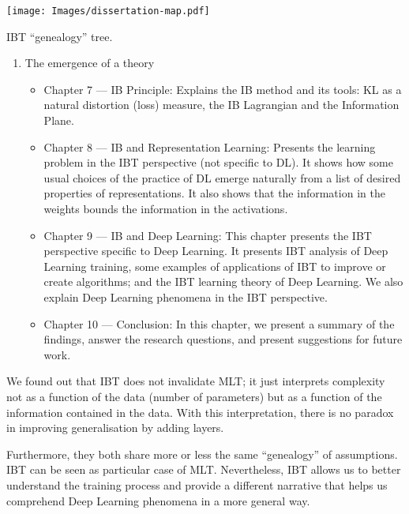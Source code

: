 \documentclass[
  letterpaper,
  12pt,
  british]{tufte-book}
\theoremstyle{plain}
\theoremstyle{plain}
\theoremstyle{definition}
\theoremstyle{remark}
\begin{document}
\begin{marginfigure}

{\centering \texttt{[image: Images/dissertation-map.pdf]}

}

\caption{IBT ``genealogy'' tree.}

\end{marginfigure}

\begin{enumerate}
\def\labelenumi{\arabic{enumi}.}
\setcounter{enumi}{2}
\item
  The emergence of a theory

  \begin{itemize}
  \item
    Chapter 7 --- IB Principle: Explains the IB method and its tools:
    {KL} as a natural distortion (loss) measure, the IB Lagrangian and
    the Information Plane.
  \item
    Chapter 8 --- IB and Representation Learning: Presents the learning
    problem in the {IBT} perspective (not specific to {DL}). It shows
    how some usual choices of the practice of {DL} emerge naturally from
    a list of desired properties of representations. It also shows that
    the information in the weights bounds the information in the
    activations.
  \item
    Chapter 9 --- IB and Deep Learning: This chapter presents the {IBT}
    perspective specific to Deep Learning. It presents {IBT} analysis of
    Deep Learning training, some examples of applications of {IBT} to
    improve or create algorithms; and the {IBT} learning theory of Deep
    Learning. We also explain Deep Learning phenomena in the {IBT}
    perspective.
  \item
    Chapter 10 --- Conclusion: In this chapter, we present a summary of
    the findings, answer the research questions, and present suggestions
    for future work.
  \end{itemize}
\end{enumerate}

We found out that {IBT} does not invalidate {MLT}; it just interprets
complexity not as a function of the data (number of parameters) but as a
function of the information contained in the data. With this
interpretation, there is no paradox in improving generalisation by
adding layers.

Furthermore, they both share more or less the same ``genealogy'' of
assumptions. {IBT} can be seen as particular case of {MLT}.
Nevertheless, {IBT} allows us to better understand the training process
and provide a different narrative that helps us comprehend Deep Learning
phenomena in a more general way.
\end{document}
